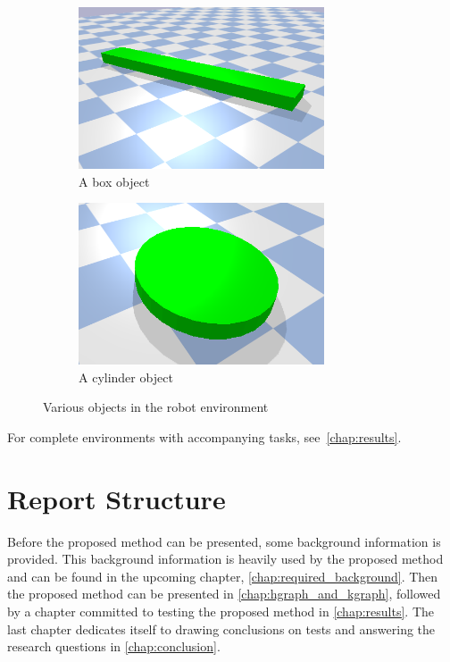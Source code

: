 \begin{figure}[H]
    \centering
    \begin{subfigure}{.5\textwidth}
    \centering
    \includegraphics[width=0.8\textwidth]{figures/box_object.png}
    \caption{A box object}
    \end{subfigure}%
    \begin{subfigure}{.5\textwidth}
    \centering
    \includegraphics[width=0.8\textwidth]{figures/cylinder_object.png}
    \caption{A cylinder object}
    \end{subfigure}%
    \caption{Various objects in the robot environment}%
    \label{fig:example_objects}
\end{figure}

For complete environments with accompanying tasks, see~\cref{chap:results}.\bs

\section{Report Structure}%
\label{sec:report_structure}
Before the proposed method can be presented, some background information is provided. This background information is heavily used by the proposed method and can be found in the upcoming chapter, \cref{chap:required_background}. Then the proposed method can be presented in \cref{chap:hgraph_and_kgraph}, followed by a chapter committed to testing the proposed method in \cref{chap:results}. The last chapter dedicates itself to drawing conclusions on tests and answering the research questions in \cref{chap:conclusion}.\bs
